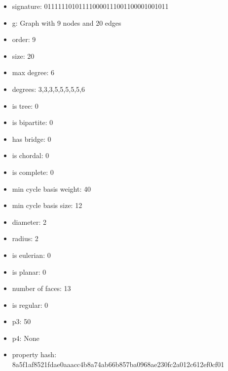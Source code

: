\newpage
\begin{figure}
\end{figure}
\begin{itemize}
\item signature: 011111101011110000111001100001001011
\item g: Graph with 9 nodes and 20 edges
\item order: 9
\item size: 20
\item max degree: 6
\item degrees: 3,3,3,5,5,5,5,5,6
\item is tree: 0
\item is bipartite: 0
\item has bridge: 0
\item is chordal: 0
\item is complete: 0
\item min cycle basis weight: 40
\item min cycle basis size: 12
\item diameter: 2
\item radius: 2
\item is eulerian: 0
\item is planar: 0
\item number of faces: 13
\item is regular: 0
\item p3: 50
\item p4: None
\item property hash: 8a5f1af8521fdae0aaacc4b8a74ab66b857ba0968ae230fc2a012c612ef0cf01
\end{itemize}
